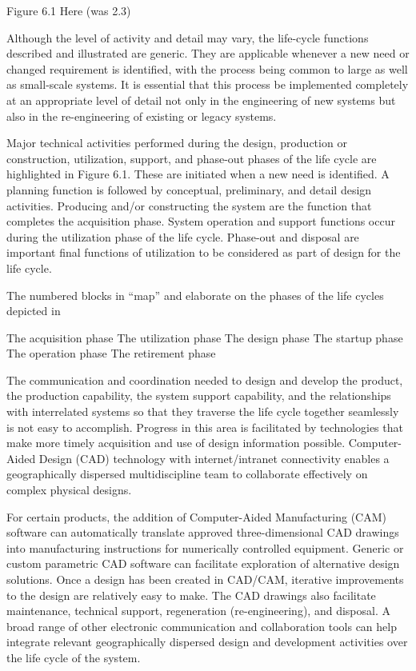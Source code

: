 Figure 6.1 Here (was 2.3)

Although the level of activity and detail may vary, the life-cycle functions described and illustrated are generic. They are applicable whenever a new need or changed requirement is identified, with the process being common to large as well as small-scale systems. It is essential that this process be implemented completely at an appropriate level of detail not only in the engineering of new systems but also in the re-engineering of existing or legacy systems.

Major technical activities performed during the design, production or construction, utilization, support, and phase-out phases of the life cycle are highlighted in Figure 6.1. These are initiated when a new need is identified. A planning function is followed by conceptual, preliminary, and detail design activities. Producing and/or constructing the system are the function that completes the acquisition phase. System operation and support functions occur during the utilization phase of the life cycle. Phase-out and disposal are important final functions of utilization to be considered as part of design for the life cycle.

The numbered blocks in ``map'' and elaborate on the phases of the life cycles depicted in 

The acquisition phase 
The utilization phase
The design phase
The startup phase
The operation phase
The retirement phase

The communication and coordination needed to design and develop the product, the production capability, the system support capability, and the relationships with interrelated systems so that they traverse the life cycle together seamlessly is not easy to accomplish. Progress in this area is facilitated by technologies that make more timely acquisition and use of design information possible. Computer-Aided Design (CAD) technology with internet/intranet connectivity enables a geographically dispersed multidiscipline team to collaborate effectively on complex physical designs.

For certain products, the addition of Computer-Aided Manufacturing (CAM) software can automatically translate approved three-dimensional CAD drawings into manufacturing instructions for numerically controlled equipment. Generic or custom parametric CAD software can facilitate exploration of alternative design solutions. Once a design has been created in CAD/CAM, iterative improvements to the design are relatively easy to make. The CAD drawings also facilitate maintenance, technical support, regeneration (re-engineering), and disposal. A broad range of other electronic communication and collaboration tools can help integrate relevant geographically dispersed design and development activities over the life cycle of the system.


